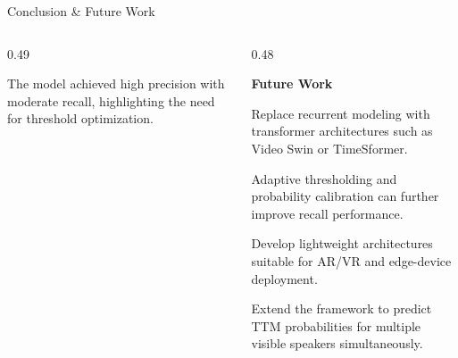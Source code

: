 \documentclass[aspectratio=169, 10pt]{beamer}
\begin{document}
\begin{frame}{Conclusion \& Future Work}
\begin{columns}[T,onlytextwidth]
\begin{column}{0.49\textwidth}
\begin{tcolorbox}[
orangecard,
title={\small Precision vs Recall},
boxsep=1pt,
left=2pt,right=2pt,
top=2pt,bottom=2pt]
\footnotesize
The model achieved high precision with moderate recall, highlighting the need for threshold optimization.

\end{tcolorbox}

\end{column}

\begin{column}{0.48\textwidth}

\textcolor{NavyBlue}{\small\bfseries Future Work}

\vspace{2pt}

\begin{tcolorbox}[
bluecard,
title={\small Video Transformers},
boxsep=1pt,
left=2pt,right=2pt,
top=2pt,bottom=2pt]

\footnotesize
Replace recurrent modeling with transformer architectures such as Video Swin or TimeSformer.

\end{tcolorbox}

\vspace{2pt}

\begin{tcolorbox}[
tealcard,
title={\small Threshold Optimization},
boxsep=1pt,
left=2pt,right=2pt,
top=2pt,bottom=2pt]

\footnotesize
Adaptive thresholding and probability calibration can further improve recall performance.

\end{tcolorbox}

\vspace{2pt}

\begin{tcolorbox}[
orangecard,
title={\small Real-Time Deployment},
boxsep=1pt,
left=2pt,right=2pt,
top=2pt,bottom=2pt]

\footnotesize
Develop lightweight architectures suitable for AR/VR and edge-device deployment.

\end{tcolorbox}

\vspace{2pt}

\begin{tcolorbox}[
purplecard,
title={\small Multi-Speaker Attribution},
boxsep=1pt,
left=2pt,right=2pt,
top=2pt,bottom=2pt]

\footnotesize
Extend the framework to predict TTM probabilities for multiple visible speakers simultaneously.

\end{tcolorbox}

\end{column}

\end{columns}

\end{frame}
\end{document}
